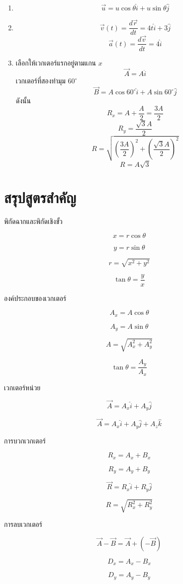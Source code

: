 \begin{enumerate}
    \item
    \[
    \vec{u}=u\cos\theta\hat{i}+u\sin\theta\hat{j}
    \]

    \item
    \[
    \vec{v}(t)=\frac{d\vec{r}}{dt}=4t\hat{i}+3\hat{j}
    \]
    \[
    \vec{a}(t)=\frac{d\vec{v}}{dt}=4\hat{i}
    \]

    \item
    เลือกให้เวกเตอร์แรกอยู่ตามแกน $x$
    \[
    \vec{A}=A\hat{i}
    \]
    เวกเตอร์ที่สองทำมุม $60^\circ$
    \[
    \vec{B}=A\cos60^\circ\hat{i}+A\sin60^\circ\hat{j}
    \]
    ดังนั้น
    \[
    R_x=A+\frac{A}{2}=\frac{3A}{2}
    \]
    \[
    R_y=\frac{\sqrt{3}A}{2}
    \]
    \[
    R=\sqrt{\left(\frac{3A}{2}\right)^2+\left(\frac{\sqrt{3}A}{2}\right)^2}
    \]
    \[
    R=A\sqrt{3}
    \]
\end{enumerate}

\section{สรุปสูตรสำคัญ}

\begin{tcolorbox}[title=สรุปบทที่ 3: เวกเตอร์]
พิกัดฉากและพิกัดเชิงขั้ว

\[
x=r\cos\theta
\]

\[
y=r\sin\theta
\]

\[
r=\sqrt{x^2+y^2}
\]

\[
\tan\theta=\frac{y}{x}
\]

องค์ประกอบของเวกเตอร์

\[
A_x=A\cos\theta
\]

\[
A_y=A\sin\theta
\]

\[
A=\sqrt{A_x^2+A_y^2}
\]

\[
\tan\theta=\frac{A_y}{A_x}
\]

เวกเตอร์หน่วย

\[
\vec{A}=A_x\hat{i}+A_y\hat{j}
\]

\[
\vec{A}=A_x\hat{i}+A_y\hat{j}+A_z\hat{k}
\]

การบวกเวกเตอร์

\[
R_x=A_x+B_x
\]

\[
R_y=A_y+B_y
\]

\[
\vec{R}=R_x\hat{i}+R_y\hat{j}
\]

\[
R=\sqrt{R_x^2+R_y^2}
\]

การลบเวกเตอร์

\[
\vec{A}-\vec{B}=\vec{A}+(-\vec{B})
\]

\[
D_x=A_x-B_x
\]

\[
D_y=A_y-B_y
\]
\end{tcolorbox}

